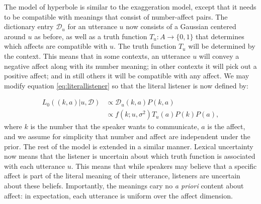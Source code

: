 \documentclass{article} %
\newcommand{\dictionary}{\ensuremath{\mathcal{D}}\xspace}
\begin{document}
The model of hyperbole is similar to the exaggeration model, except that it needs to be compatible with meanings that consist of number-affect pairs. The dictionary entry $\dictionary_u$ for an utterance $u$ now consists of a Gaussian centered around $u$ as before, as well as a truth function $T_u:A\rightarrow \{0,1\}$ that determines which affects are compatible with $u$. The truth function $T_u$ will be determined by the context. This means that in some contexts, an utterance $u$ will convey a negative affect along with its number meaning; in other contexts it will pick out a positive affect; and in still others it will be compatible with any affect. We may modify equation \ref{eq:literallistener} so that the literal listener is now defined by:

\begin{align}\label{eq:affectliteral}
L_0((k,a) | u, \dictionary) &\propto \dictionary_u(k,a)P(k,a) \\
&\propto f(k;u,\sigma^2)T_u(a)P(k)P(a),
\end{align}
where $k$ is the number that the speaker wants to communicate, $a$ is the affect, and we assume for simplicity that number and affect are independent under the prior. 
The rest of the model is extended in a similar manner. Lexical uncertainty now means that the listener is uncertain about which truth function is associated with each utterance $u$. This means that while speakers may believe that a specific affect is part of the literal meaning of their utterance, listeners are uncertain about these beliefs. Importantly, the meanings cary no \emph{a priori} content about affect: in expectation, each utterance is uniform over the affect dimension. 
\end{document}

